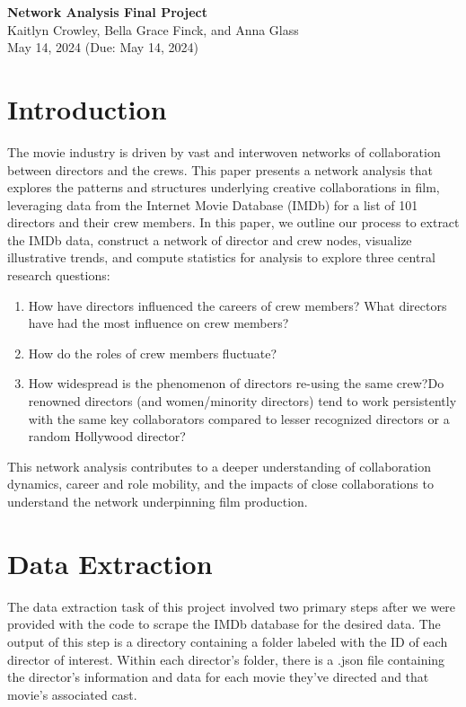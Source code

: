 \documentclass[12pt]{article}
\begin{document}
\begin{centering}
{\large\textbf{Network Analysis Final Project}}\\ 
Kaitlyn Crowley, Bella Grace Finck, and Anna Glass\\
May 14, 2024 (Due: May 14, 2024)\\
\end{centering}


\section*{Introduction}

The movie industry is driven by vast and interwoven networks of collaboration between directors and the crews. This paper presents a network analysis that explores the patterns and structures underlying creative collaborations in film, leveraging data from the Internet Movie Database (IMDb) for a list of 101 directors and their crew members. In this paper, we outline our process to extract the IMDb data, construct a network of director and crew nodes, visualize illustrative trends, and compute statistics for analysis to explore three central research questions:

\begin{enumerate}
    \item How have directors influenced the careers of crew members? What directors have had the most influence on crew members?
    \item How do the roles of crew members fluctuate?
    \item How widespread is the phenomenon of directors re-using the same crew?Do renowned directors (and women/minority directors) tend to work persistently with the same key collaborators compared to lesser recognized directors or a random Hollywood director? 
\end{enumerate}

\noindent This network analysis contributes to a deeper understanding of collaboration dynamics, career and role mobility, and the impacts of close collaborations to understand the network underpinning film production.

\section*{Data Extraction}
The data extraction task of this project involved two primary steps after we were provided with the code to scrape the IMDb database for the desired data. The output of this step is a directory containing a folder labeled with the ID of each director of interest. Within each director's folder, there is a .json file containing the director's information and data for each movie they've directed and that movie's associated cast.
\end{document}
